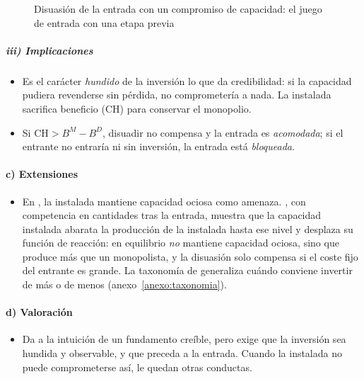 \documentclass[11pt]{article}
\begin{document}
\begin{figure}[H]
\centering
\caption{Disuasión de la entrada con un compromiso de capacidad: el juego de entrada con una etapa previa}\label{fig:disuasion-arbol}
\end{figure}

\subparagraph{iii) Implicaciones}

\begin{itemize}
\item Es el carácter \emph{hundido} de la inversión lo que da credibilidad: si la capacidad pudiera revenderse sin pérdida, no comprometería a nada. La instalada sacrifica beneficio ($\mathrm{CH}$) para conservar el monopolio.
\item Si $\mathrm{CH}>B^{M}-B^{D}$, disuadir no compensa y la entrada es \emph{acomodada}; si el entrante no entraría ni sin inversión, la entrada está \emph{bloqueada}\nocite{Bain1956Barriers}.
\end{itemize}

\paragraph{c) Extensiones}

\begin{itemize}
\item En \textcite{Spence1977Entry}, la instalada mantiene capacidad ociosa como amenaza. \textcite{Dixit1980Role}, con competencia en cantidades tras la entrada, muestra que la capacidad instalada abarata la producción de la instalada hasta ese nivel y desplaza su función de reacción: en equilibrio \emph{no} mantiene capacidad ociosa, sino que produce más que un monopolista, y la disuasión solo compensa si el coste fijo del entrante es grande. La taxonomía de \textcite{FudenbergTirole1984Fat} generaliza cuándo conviene invertir de más o de menos (anexo~\ref{anexo:taxonomia}).
\end{itemize}

\paragraph{d) Valoración}

\begin{itemize}
\item Da a la intuición de  un fundamento creíble, pero exige que la inversión sea hundida y observable, y que preceda a la entrada. Cuando la instalada no puede comprometerse así, le quedan otras conductas.
\end{itemize}
\end{document}
